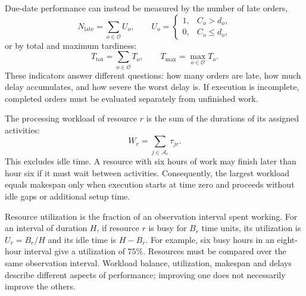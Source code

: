 Due-date performance can instead be measured by the number of late orders,
\begin{equation}
    N_{\mathrm{late}}=\sum_{o\in\mathcal O}U_o,
    \qquad
    U_o=\begin{cases}1,&C_o>d_o,\\0,&C_o\leq d_o,\end{cases}
    \label{eq:number-late-orders}
\end{equation}
or by total and maximum tardiness:
\begin{equation}
    T_{\mathrm{tot}}=\sum_{o\in\mathcal O}T_o,
    \qquad T_{\max}=\max_{o\in\mathcal O}T_o.
    \label{eq:tardiness-indicators}
\end{equation}
These indicators answer different questions: how many orders are late, how
much delay accumulates, and how severe the worst delay is. If execution is
incomplete, completed orders must be evaluated separately from unfinished work.

The processing workload of resource $r$ is the sum of the durations of its
assigned activities:
\begin{equation}
    W_r=\sum_{j\in\mathcal A_r}\tau_{jr}.
    \label{eq:actual-resource-workload}
\end{equation}
This excludes idle time. A resource with six hours of work may finish later
than hour six if it must wait between activities. Consequently, the largest
workload equals makespan only when execution starts at time zero and proceeds
without idle gaps or additional setup time.

Resource utilization is the fraction of an observation interval spent working.
For an interval of duration $H$, if resource $r$ is busy for $B_r$ time units,
its utilization is $U_r=B_r/H$ and its idle time is $H-B_r$. For example,
six busy hours in an eight-hour interval give a utilization of $75\%$.
Resources must be compared over the same observation interval. Workload balance,
utilization, makespan and delays describe different aspects of performance;
improving one does not necessarily improve the others.
